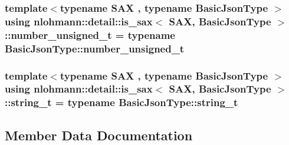 \subsubsection[{\texorpdfstring{number\+\_\+unsigned\+\_\+t}{number_unsigned_t}}]{\setlength{\rightskip}{0pt plus 5cm}template$<$typename S\+AX , typename Basic\+Json\+Type $>$ using {\bf nlohmann\+::detail\+::is\+\_\+sax}$<$ S\+AX, Basic\+Json\+Type $>$\+::{\bf number\+\_\+unsigned\+\_\+t} =  typename Basic\+Json\+Type\+::number\+\_\+unsigned\+\_\+t\hspace{0.3cm}{\ttfamily [private]}}\hypertarget{structnlohmann_1_1detail_1_1is__sax_a655c9b8038e51e5b9211e2419118644d}{}\label{structnlohmann_1_1detail_1_1is__sax_a655c9b8038e51e5b9211e2419118644d}
\subsubsection[{\texorpdfstring{string\+\_\+t}{string_t}}]{\setlength{\rightskip}{0pt plus 5cm}template$<$typename S\+AX , typename Basic\+Json\+Type $>$ using {\bf nlohmann\+::detail\+::is\+\_\+sax}$<$ S\+AX, Basic\+Json\+Type $>$\+::{\bf string\+\_\+t} =  typename Basic\+Json\+Type\+::string\+\_\+t\hspace{0.3cm}{\ttfamily [private]}}\hypertarget{structnlohmann_1_1detail_1_1is__sax_ad8e2e1427ff43536370b6db6ab83ae50}{}\label{structnlohmann_1_1detail_1_1is__sax_ad8e2e1427ff43536370b6db6ab83ae50}


\subsection{Member Data Documentation}
